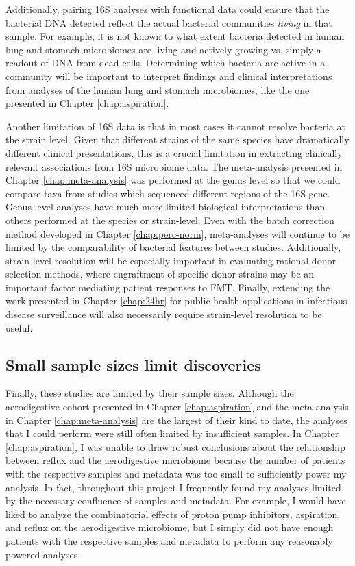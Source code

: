 Additionally, pairing 16S analyses with functional data could ensure that the bacterial DNA detected reflect the actual bacterial communities \textit{living} in that sample.
For example, it is not known to what extent bacteria detected in human lung and stomach microbiomes are living and actively growing vs. simply a readout of DNA from dead cells.
Determining which bacteria are active in a community will be important to interpret findings and clinical interpretations from analyses of the human lung and stomach microbiomes, like the one presented in Chapter \ref{chap:aspiration}.

Another limitation of 16S data is that in most cases it cannot resolve bacteria at the strain level.
Given that different strains of the same species have dramatically different clinical presentations, this is a crucial limitation in extracting clinically relevant associations from 16S microbiome data.
The meta-analysis presented in Chapter \ref{chap:meta-analysis} was performed at the genus level so that we could compare taxa from studies which sequenced different regions of the 16S gene.
Genus-level analyses have much more limited biological interpretations than others performed at the species or strain-level.
Even with the batch correction method developed in Chapter \ref{chap:perc-norm}, meta-analyses will continue to be limited by the comparability of bacterial features between studies.
Additionally, strain-level resolution will be especially important in evaluating rational donor selection methods, where engraftment of specific donor strains may be an important factor mediating patient responses to FMT.
Finally, extending the work presented in Chapter \ref{chap:24hr} for public health applications in infectious disease surveillance will also necessarily require strain-level resolution to be useful.

\subsection{Small sample sizes limit discoveries}

Finally, these studies are limited by their sample sizes.
Although the aerodigestive cohort presented in Chapter \ref{chap:aspiration} and the meta-analysis in Chapter \ref{chap:meta-analysis} are the largest of their kind to date, the analyses that I could perform were still often limited by insufficient samples.
In Chapter \ref{chap:aspiration}, I was unable to draw robust conclusions about the relationship between reflux and the aerodigestive microbiome because the number of patients with the respective samples and metadata was too small to sufficiently power my analysis.
In fact, throughout this project I frequently found my analyses limited by the necessary confluence of samples and metadata.
For example, I would have liked to analyze the combinatorial effects of proton pump inhibitors, aspiration, and reflux on the aerodigestive microbiome, but I simply did not have enough patients with the respective samples and metadata to perform any reasonably powered analyses.

